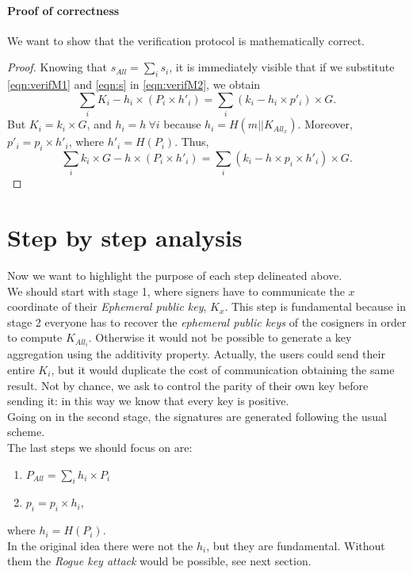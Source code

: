 \paragraph{Proof of correctness}
We want to show that the verification protocol is mathematically correct.
\begin{proof}
	Knowing that $s_{All}=\sum_{i}{s_{i}}$, it is immediately visible that if we substitute \eqref{eqn:verifM1} and \eqref{eqn:s} in \eqref{eqn:verifM2}, we obtain
	\begin{equation}
	\sum_{i} {K_{i} - h_{i} \times (P_{i}\times h'_{i})} =\sum_{i} (k_{i} - h_{i}\times p'_{i})\times G.
	\end{equation}
	But $K_{i}=k_{i} \times G$, and $h_{i}=h\ \forall i$ because $h_{i}=H(m||K_{All_x})$. Moreover, $p'_{i}= p_{i}\times h'_{i}$, where $h'_{i}=H(P_{i})$. Thus,
	\begin{equation}
	\sum_{i} {k_{i} \times G - h \times (P_{i}\times h'_{i})} =\sum_{i} (k_{i} - h\times p_{i}\times h'_{i})\times G.
	\end{equation}
	
\end{proof}


\section{Step by step analysis}
Now we want to highlight the purpose of each step delineated above.\\
We should start with stage 1, where signers have to communicate the $x$ coordinate of their \textit{Ephemeral public key}, $K_{x}$. This step is fundamental because in stage 2 everyone has to recover the \textit{ephemeral public keys} of the cosigners in order to compute $K_{All_{i}}$. Otherwise it would not be possible to generate a key aggregation using the additivity property. Actually, the users could send their entire $K_{i}$, but it would duplicate the cost of communication obtaining the same result. Not by chance, we ask to control the parity of their own key before sending it: in this way we know that every key is positive.\\
Going on in the second stage, the signatures are generated following the usual scheme.\\
The last steps we should focus on are:
\begin{enumerate}
	\item $P_{All}=\sum_{i} h_{i}\times P_{i}$
	\item $p_{i}=p_{i}\times h_{i}$,
\end{enumerate}
where $h_{i}=H(P_{i})$.\\
In the original idea there were not the $h_{i}$, but they are fundamental. Without them the \textit{Rogue key attack} would be possible, see next section.
